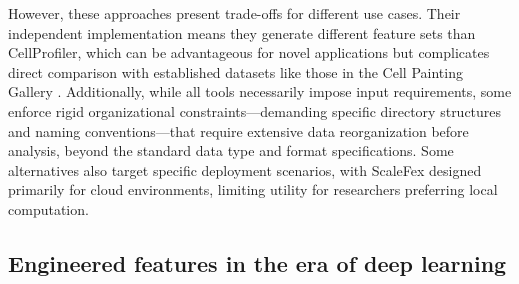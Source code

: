 \documentclass{article}
\begin{document}
 However, these approaches present trade-offs for different use cases. 
 Their independent implementation means they generate different feature sets than CellProfiler, which can be advantageous for novel
 applications but complicates direct comparison with established datasets like those in the Cell Painting Gallery \cite{weisbartCellPaintingGallery2024}. 
Additionally, while all tools necessarily impose input requirements, some enforce rigid organizational constraints—demanding specific directory structures and naming conventions—that require extensive data reorganization before analysis, beyond the standard data type and format specifications.
Some alternatives also target specific deployment scenarios, with ScaleFex designed primarily for cloud environments, limiting utility for researchers preferring local computation.

\subsection{Engineered features in the era of deep learning}
\label{sec:org9dc3dfa}
\end{document}
